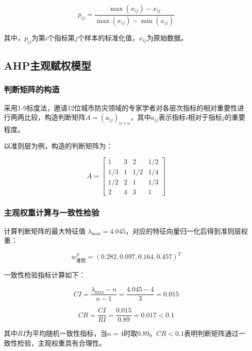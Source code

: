 \documentclass[12pt]{article}
\begin{document}
\begin{equation}
    p_{ij} = \frac{\max(x_{ij}) - x_{ij}}{\max(x_{ij}) - \min(x_{ij})}
    \label{eq:negative}
\end{equation}

其中，$p_{ij}$为第$i$个指标第$j$个样本的标准化值，$x_{ij}$为原始数据。

\subsection{AHP主观赋权模型}
\subsubsection{判断矩阵的构造}
采用1-9标度法，邀请12位城市防灾领域的专家学者对各层次指标的相对重要性进行两两比较，构造判断矩阵$A=(a_{ij})_{n\times n}$，其中$a_{ij}$表示指标$i$相对于指标$j$的重要程度。

以准则层为例，构造的判断矩阵为：

\begin{equation}
    A = 
    \begin{bmatrix}
        1 & 3 & 2 & 1/2 \\
        1/3 & 1 & 1/2 & 1/4 \\
        1/2 & 2 & 1 & 1/3 \\
        2 & 4 & 3 & 1
    \end{bmatrix}
    \label{eq:judge}
\end{equation}

\subsubsection{主观权重计算与一致性检验}
计算判断矩阵的最大特征值 $\lambda_{\max}=4.045$，对应的特征向量归一化后得到准则层权重：

\begin{equation}
    w^{S}_{\text{准则}} = (0.282, 0.097, 0.164, 0.457)^T
\end{equation}

一致性检验指标计算如下：

\begin{equation}
    CI = \frac{\lambda_{\max} - n}{n-1} = \frac{4.045-4}{3} = 0.015
\end{equation}

\begin{equation}
    CR = \frac{CI}{RI} = \frac{0.015}{0.89} = 0.017 < 0.1
\end{equation}

其中$RI$为平均随机一致性指标，当$n=4$时取0.89。$CR<0.1$表明判断矩阵通过一致性检验，主观权重具有合理性。
\end{document}
